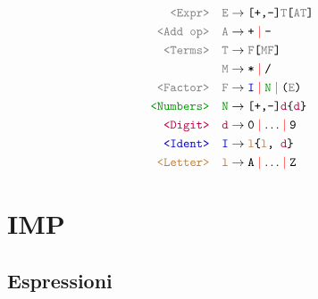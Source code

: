 \documentclass[a4paper]{article}
\begin{document}
\[
  \begin{aligned}
    \texttt{\color{gray}<Expr>} \quad &\texttt{\color{gray}E\color{black}} \to
    \texttt{[+,-]\color{gray}
    T\color{black} [\color{gray}A\color{black} \color{gray}T\color{black}]} \\
    \texttt{\color{gray}<Add op>} \quad &\texttt{\color{gray}A\color{black}} \to
    \texttt{+} \color{red}\mid\color{black} \texttt{-} \\
    \texttt{\color{gray}<Terms>} \quad &\texttt{\color{gray}T\color{black}} \to
    \texttt{\color{gray}F\color{black} [\color{gray}M\color{black}
    \color{gray}F\color{black}]} \\
                                       &\texttt{\color{gray}M\color{black}} \to
                                       \texttt{*} \color{red}\mid\color{black}
                                       \texttt{/} \\
    \texttt{\color{gray}<Factor>} \quad &\texttt{\color{gray}F\color{black}} \to 
    \color{blue!80!black}\texttt{I}\color{red} \color{red}\mid\color{black}
    \color{green!60!black}\texttt{N}\color{black} \color{red}\mid\color{black} \texttt{\color{black}(\color{gray}E\color{black})} \\
    \texttt{\color{green!60!black}{<Numbers>}} \quad &\texttt{\color{green!60!black}N\color{black}}
    \to \texttt{[+,-]\color{purple}d\color{black}\{\color{purple}d\color{black}\}} \\
    \texttt{\color{purple}{<Digit>}} \quad &\texttt{\color{purple}d\color{black}} \to
    \texttt{0} \color{red}\mid\color{black} \ldots \color{red}\mid\color{black} \texttt{9} \\
    \texttt{\color{blue!80!black}{<Ident>}} \quad &\texttt{\color{blue!80!black}I\color{black}} \to
    \texttt{\color{brown}l\color{black}\{\color{brown}l\color{black},
    \color{purple}d\color{black}\}} \\
    \texttt{\color{brown}{<Letter>}} \quad &\texttt{\color{brown}l\color{black}} \to
    \texttt{A} \color{red}\mid\color{black} \ldots \color{red}\mid\color{black} \texttt{Z}
  \end{aligned}
\] 


\section{IMP}

\subsection{Espressioni} 
\end{document}

